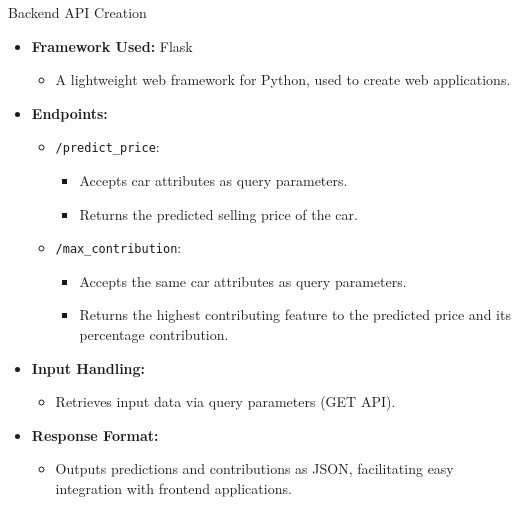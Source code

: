 \documentclass{beamer}
\begin{document}
\begin{frame}{Backend API Creation}
    \begin{itemize}
        \item \textbf{Framework Used:} Flask
        \begin{itemize}
            \item A lightweight web framework for Python, used to create web applications.
        \end{itemize}
        
        \item \textbf{Endpoints:}
        \begin{itemize}
            \item \texttt{/predict\_price}: 
            \begin{itemize}
                \item Accepts car attributes as query parameters.
                \item Returns the predicted selling price of the car.
            \end{itemize}
            \item \texttt{/max\_contribution}: 
            \begin{itemize}
                \item Accepts the same car attributes as query parameters.
                \item Returns the highest contributing feature to the predicted price and its percentage contribution.
            \end{itemize}
        \end{itemize}
        
        \item \textbf{Input Handling:}
        \begin{itemize}
            \item Retrieves input data via query parameters (GET API).
        \end{itemize}
        
        \item \textbf{Response Format:}
        \begin{itemize}
            \item Outputs predictions and contributions as JSON, facilitating easy integration with frontend applications.
        \end{itemize}
    \end{itemize}
\end{frame}
\end{document}
